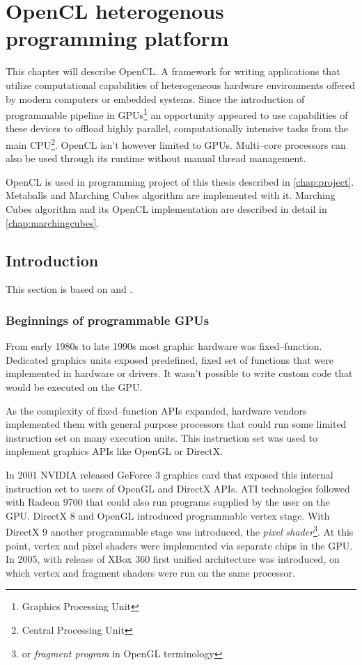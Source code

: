 \chapter{OpenCL heterogenous programming platform}
\label{chap:cl}
This chapter will describe OpenCL. A framework for writing applications that
utilize computational capabilities of heterogeneous hardware environments offered
by modern computers or embedded systems. Since the introduction of programmable pipeline
in GPUs\footnote{Graphics Processing Unit} an opportunity appeared to use
capabilities of these devices to offload highly parallel, computationally
intensive tasks from the main CPU\footnote{Central Processing Unit}. OpenCL
isn't however limited to GPUs. Multi--core processors can also be used through
its runtime without manual thread management.

OpenCL is used in programming project of this thesis described in \autoref{chap:project}.
Metaballs and Marching Cubes algorithm are implemented with it. Marching Cubes
algorithm and its OpenCL implementation are described in detail in
\autoref{chap:marchingcubes}.

\section{Introduction}
This section is based on \cite{Kirk:2010:PMP:1841511} and
\cite{gaster2012heterogeneous}.

\subsection{Beginnings of programmable GPUs}

From early 1980s to late 1990s most graphic hardware was fixed--function.
Dedicated graphics units exposed predefined, fixed set of functions that were
implemented in hardware or drivers. It wasn't possible to write custom code
that would be executed on the GPU.

As the complexity of fixed--function APIs expanded, hardware vendors implemented
them with general purpose processors that could run some limited instruction set
on many execution units. This instruction set was used to implement graphics APIs
like OpenGL or DirectX.

In 2001 NVIDIA released GeForce 3 graphics card that exposed this internal
instruction set to users of OpenGL and DirectX APIs. ATI technologies followed
with Radeon 9700 that could also run programs supplied by the user on the GPU.
DirectX 8 and OpenGL introduced programmable vertex stage. With
DirectX 9 another programmable stage was introduced, the \emph{pixel shader}\footnote{or \emph{fragment program} in
OpenGL terminology}. At this point, vertex and pixel shaders were
implemented via separate chips in the GPU. In 2005, with release of XBox 360
first unified architecture was introduced, on which vertex and fragment shaders
were run on the same processor.

